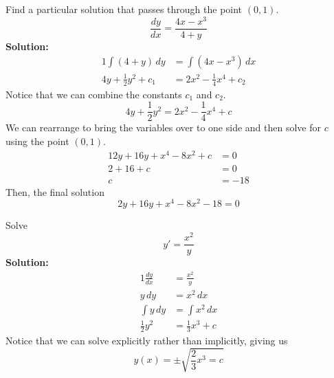 \documentclass[diffeq.tex]{subfiles}
\begin{document}
    \begin{example}
        Find a particular solution that passes through the point $(0, 1)$.
        \begin{equation}
            \frac{dy}{dx} = \frac{4x - x^{3}}{4 + y}
        \end{equation}
        \textbf{Solution:}
        \begin{alignat}{1}
            \int(4 + y)\,dy &= \int(4x - x^{3})\,dx\\
            4y + \frac{1}{2}y^{2} + c_{1} &= 2x^{2} - \frac{1}{4}x^{4} + c_{2}
        \end{alignat}
        Notice that we can combine the constants $c_{1}$ and $c_{2}$.
        \begin{equation}
            4y + \frac{1}{2}y^{2} = 2x^{2} - \frac{1}{4}x^{4} + c
        \end{equation}
        We can rearrange to bring the variables over to one side and then solve for $c$ using the point $(0, 1)$.
        \begin{alignat}{1}
            2y + 16y + x^{4} -8x^{2} + c &= 0\\
            2 + 16 + c &= 0\\
            c &= -18
        \end{alignat}
        Then, the final solution
        \begin{equation}
            2y + 16y + x^{4} - 8x^{2} - 18 = 0
        \end{equation}
    \end{example}
    \begin{homework}
        Solve
        \begin{equation}
            y' = \frac{x^{2}}{y}
        \end{equation}
        \textbf{Solution:}
        \begin{alignat}{1}
            \frac{dy}{dx} &= \frac{x^{2}}{y}\\
            y\,dy &= x^{2}\,dx\\
            \int y\,dy &= \int x^{2}\,dx\\
            \frac{1}{2}y^{2} &= \frac{1}{3}x^{3} + c
        \end{alignat}
        Notice that we can solve explicitly rather than implicitly, giving us
        \begin{equation}
            y(x) = \pm \sqrt{\frac{2}{3}x^{3} = c}
        \end{equation}
    \end{homework}
\end{document}
